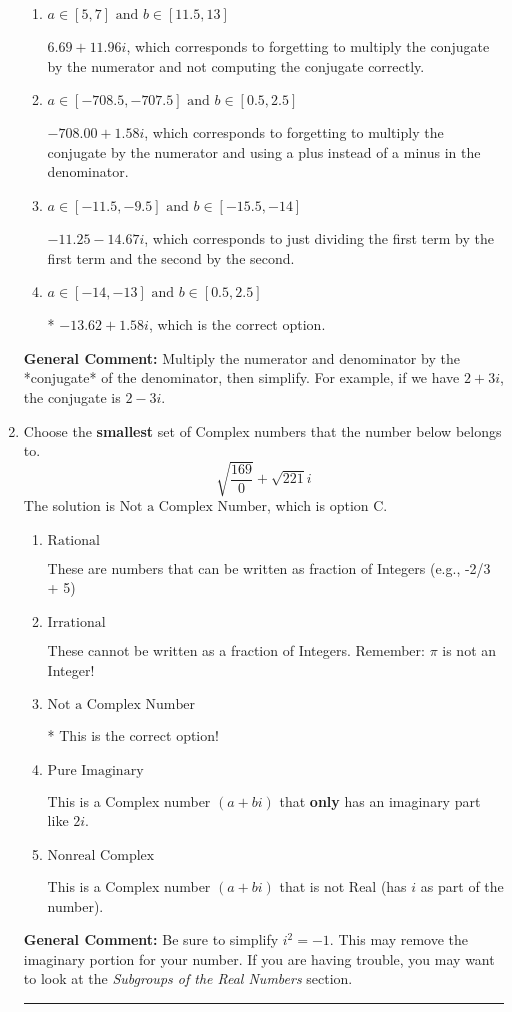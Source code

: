 \documentclass{extbook}[14pt]
\newcommand{\litem}[1]{\item #1

\rule{\textwidth}{0.4pt}}
\begin{document}
\begin{enumerate}
{\begin{enumerate}[label=\Alph*.]
 $-13.62  + 82.00 i$, which corresponds to forgetting to multiply the conjugate by the numerator.
\item \( a \in [5, 7] \text{ and } b \in [11.5, 13] \)

 $6.69  + 11.96 i$, which corresponds to forgetting to multiply the conjugate by the numerator and not computing the conjugate correctly.
\item \( a \in [-708.5, -707.5] \text{ and } b \in [0.5, 2.5] \)

 $-708.00  + 1.58 i$, which corresponds to forgetting to multiply the conjugate by the numerator and using a plus instead of a minus in the denominator.
\item \( a \in [-11.5, -9.5] \text{ and } b \in [-15.5, -14] \)

 $-11.25  - 14.67 i$, which corresponds to just dividing the first term by the first term and the second by the second.
\item \( a \in [-14, -13] \text{ and } b \in [0.5, 2.5] \)

* $-13.62  + 1.58 i$, which is the correct option.
\end{enumerate}

\textbf{General Comment:} Multiply the numerator and denominator by the *conjugate* of the denominator, then simplify. For example, if we have $2+3i$, the conjugate is $2-3i$.
}
\litem{
Choose the \textbf{smallest} set of Complex numbers that the number below belongs to.
\[ \sqrt{\frac{169}{0}}+\sqrt{221} i \]The solution is \( \text{Not a Complex Number} \), which is option C.\begin{enumerate}[label=\Alph*.]
\item \( \text{Rational} \)

These are numbers that can be written as fraction of Integers (e.g., -2/3 + 5)
\item \( \text{Irrational} \)

These cannot be written as a fraction of Integers. Remember: $\pi$ is not an Integer!
\item \( \text{Not a Complex Number} \)

* This is the correct option!
\item \( \text{Pure Imaginary} \)

This is a Complex number $(a+bi)$ that \textbf{only} has an imaginary part like $2i$.
\item \( \text{Nonreal Complex} \)

This is a Complex number $(a+bi)$ that is not Real (has $i$ as part of the number).
\end{enumerate}

\textbf{General Comment:} Be sure to simplify $i^2 = -1$. This may remove the imaginary portion for your number. If you are having trouble, you may want to look at the \textit{Subgroups of the Real Numbers} section.
}
\end{enumerate}
\end{document}
